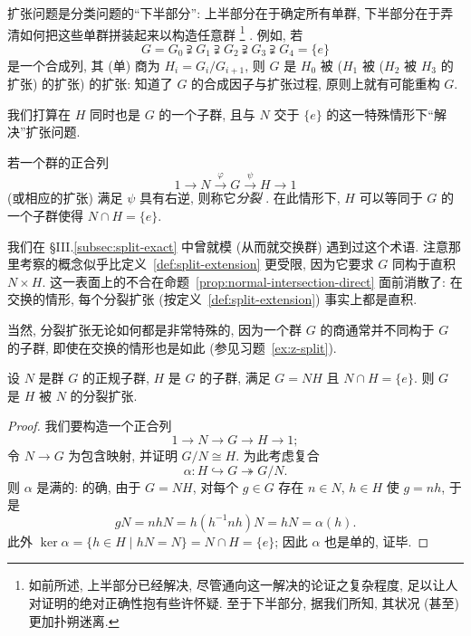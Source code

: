 扩张问题是分类问题的``下半部分'': 上半部分在于确定所有单群, 下半部分在于弄清如何把这些单群拼装起来以构造任意群%
\footnote{如前所述, 上半部分已经解决, 尽管通向这一解决的论证之复杂程度, 足以让人对证明的绝对正确性抱有些许怀疑. 至于下半部分, 据我们所知, 其状况 (甚至) 更加扑朔迷离.}%
. 例如, 若
\[
G = G_0 \supsetneqq G_1 \supsetneqq G_2 \supsetneqq G_3 \supsetneqq G_4 = \{e\}
\]
是一个合成列, 其 (单) 商为 $H_i = G_i/G_{i+1}$, 则 $G$ 是 $H_0$ 被 ($H_1$ 被 ($H_2$ 被 $H_3$ 的扩张) 的扩张) 的扩张: 知道了 $G$ 的合成因子与扩张过程, 原则上就有可能重构 $G$.

我们打算在 $H$ 同时也是 $G$ 的一个子群, 且与 $N$ 交于 $\{e\}$ 的这一特殊情形下``解决''扩张问题.

\begin{definition}
\label{def:split-extension}
若一个群的正合列
\[
1 \longrightarrow N \xrightarrow{\ \varphi\ } G \xrightarrow{\ \psi\ } H \longrightarrow 1
\]
(或相应的扩张) 满足 $\psi$ 具有右逆, 则称它\emph{分裂}%
%
. 在此情形下, $H$ 可以等同于 $G$ 的一个子群使得 $N \cap H = \{e\}$.
\end{definition}

我们在 \S III.\ref{subsec:split-exact} 中曾就模 (从而就交换群) 遇到过这个术语. 注意那里考察的概念似乎比定义~\ref{def:split-extension} 更受限, 因为它要求 $G$ 同构于直积 $N \times H$. 这一表面上的不合在命题~\ref{prop:normal-intersection-direct} 面前消散了: 在交换的情形, 每个分裂扩张 (按定义~\ref{def:split-extension}) 事实上都是直积.

当然, 分裂扩张无论如何都是非常特殊的, 因为一个群 $G$ 的商通常并不同构于 $G$ 的子群, 即使在交换的情形也是如此 (参见习题~\ref{ex:z-split}).

\begin{lemma}
\label{lem:split-extension}
设 $N$ 是群 $G$ 的正规子群, $H$ 是 $G$ 的子群, 满足 $G = NH$ 且 $N \cap H = \{e\}$. 则 $G$ 是 $H$ 被 $N$ 的分裂扩张.
\end{lemma}

\begin{proof}
我们要构造一个正合列
\[
1 \longrightarrow N \longrightarrow G \longrightarrow H \longrightarrow 1;
\]
令 $N \to G$ 为包含映射, 并证明 $G/N \cong H$. 为此考虑复合
\[
\alpha : H \hookrightarrow G \twoheadrightarrow G/N.
\]
则 $\alpha$ 是满的: 的确, 由于 $G = NH$, 对每个 $g \in G$ 存在 $n \in N$, $h \in H$ 使 $g = nh$, 于是
\[
g N = n h N = h (h^{-1} n h) N = h N = \alpha(h).
\]
此外 $\ker \alpha = \{h \in H \mid hN = N\} = N \cap H = \{e\}$; 因此 $\alpha$ 也是单的, 证毕.
\end{proof}


